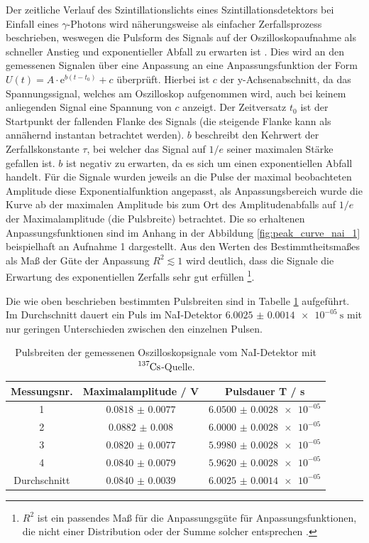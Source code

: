 Der zeitliche Verlauf des Szintillationslichts eines Szintillationsdetektors bei Einfall eines $\gamma$-Photons wird näherungsweise als einfacher Zerfallsprozess beschrieben, weswegen die Pulsform des Signals auf der Oszilloskopaufnahme als schneller Anstieg und exponentieller Abfall zu erwarten ist \cite[158]{leotechniques}.
Dies wird an den gemessenen Signalen über eine Anpassung an eine Anpassungsfunktion der Form $U(t)=A\cdot \text{e}^{b(t-t_0)}+c$ überprüft. Hierbei ist $c$ der y-Achsenabschnitt, da das Spannungssignal, welches am Oszilloskop aufgenommen wird, auch bei keinem anliegenden Signal eine Spannung von $c$ anzeigt. Der Zeitversatz $t_0$ ist der Startpunkt der fallenden Flanke des Signals (die steigende Flanke kann als annähernd instantan betrachtet werden). $b$ beschreibt den Kehrwert der Zerfallskonstante $\tau$, bei welcher das Signal auf $1/e$ seiner maximalen Stärke gefallen ist. $b$ ist negativ zu erwarten, da es sich um einen exponentiellen Abfall handelt.
Für die Signale wurden jeweils an die Pulse der maximal beobachteten Amplitude diese Exponentialfunktion angepasst, als Anpassungsbereich wurde die Kurve ab der maximalen Amplitude bis zum Ort des Amplitudenabfalls auf $1/e$ der Maximalamplitude (die Pulsbreite) betrachtet. Die so erhaltenen Anpassungsfunktionen sind im Anhang in der Abbildung \ref{fig:peak_curve_nai_1} beispielhaft an Aufnahme 1 dargestellt. Aus den Werten des Bestimmtheitsmaßes als Maß der Güte der Anpassung $R^2\lesssim 1$ wird deutlich, dass die Signale die Erwartung des exponentiellen Zerfalls sehr gut erfüllen \footnote{$R^2$ ist ein passendes Maß für die Anpassungsgüte für Anpassungsfunktionen, die nicht einer Distribution oder der Summe solcher entsprechen \cite{rsquared}.}.

Die wie oben beschrieben bestimmten Pulsbreiten sind in Tabelle \ref{tab:pulsedurations_nai} aufgeführt. Im Durchschnitt dauert ein Puls im NaI-Detektor $\SI{6.0025(14)e-05}{\second}$ mit nur geringen Unterschieden zwischen den einzelnen Pulsen.

\begin{table}[h]
    \centering
    \begin{tabular}{|c|c|c|} \hline
    Messungsnr. & Maximalamplitude / V & Pulsdauer T / s\\
    \hline
    1 & $\num{0.0818(77)}$ & $\num{6.0500(28)e-05}$ \\
    2 & $\num{0.0882(80)}$ & $\num{6.0000(28)e-05}$ \\
    3 & $\num{0.0820(77)}$ & $\num{5.9980(28)e-05}$ \\
    4 & $\num{0.0840(79)}$ & $\num{5.9620(28)e-05}$ \\ \hline
    Durchschnitt & $\num{0.0840(39)}$ & $\num{6.0025(14)e-05}$ \\
    \hline
    \end{tabular}
    \caption{Pulsbreiten der gemessenen Oszilloskopsignale vom NaI-Detektor mit $\ce{ ^137Cs }$-Quelle.}
    \label{tab:pulsedurations_nai}
\end{table}


